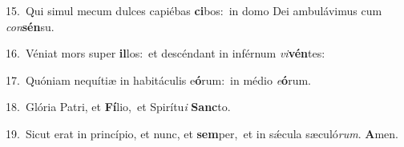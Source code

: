 {\numbfont\textcolor{\numbcolor}{15.}}~Qui simul mecum dulces capiébas \textbf{ci}\-bos:~\star in domo Dei ambulávimus cum \textit{con}\-\textbf{sén}su.\par
{\numbfont\textcolor{\numbcolor}{16.}}~Véniat mors super \textbf{il}\-los:~\star et descéndant in inférnum \textit{vi}\-\textbf{vén}tes:\par
{\numbfont\textcolor{\numbcolor}{17.}}~Quóniam nequítiæ in habitáculis e\-\textbf{ó}\-rum:~\star in médio \textit{e}\-\textbf{ó}rum.\par
{\numbfont\textcolor{\numbcolor}{18.}}~Glória Patri, et \textbf{Fí}\-lio,~\star et Spirítu\textit{i} \textbf{Sanc}\-to.\par
{\numbfont\textcolor{\numbcolor}{19.}}~Sicut erat in princípio, et nunc, et \textbf{sem}\-per,~\star et in sǽcula sæculó\-\textit{rum}\-. \textbf{A}\-men.\par
